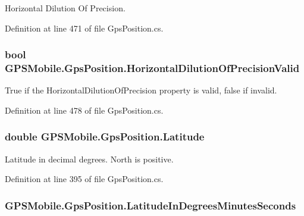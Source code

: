 Horizontal Dilution Of Precision. 

Definition at line 471 of file GpsPosition.cs.\hypertarget{class_g_p_s_mobile_1_1_gps_position_a2cf9490e66f5369dc17f9f7f885e9f3d}{
\subsubsection[{HorizontalDilutionOfPrecisionValid}]{\setlength{\rightskip}{0pt plus 5cm}bool GPSMobile.GpsPosition.HorizontalDilutionOfPrecisionValid}}
\label{class_g_p_s_mobile_1_1_gps_position_a2cf9490e66f5369dc17f9f7f885e9f3d}


True if the HorizontalDilutionOfPrecision property is valid, false if invalid. 

Definition at line 478 of file GpsPosition.cs.\hypertarget{class_g_p_s_mobile_1_1_gps_position_a165e63838ebfe0e712c142f7a757dad6}{
\subsubsection[{Latitude}]{\setlength{\rightskip}{0pt plus 5cm}double GPSMobile.GpsPosition.Latitude}}
\label{class_g_p_s_mobile_1_1_gps_position_a165e63838ebfe0e712c142f7a757dad6}


Latitude in decimal degrees. North is positive. 

Definition at line 395 of file GpsPosition.cs.\hypertarget{class_g_p_s_mobile_1_1_gps_position_abb8229583c518e399546f791d221666d}{
\subsubsection[{LatitudeInDegreesMinutesSeconds}]{ GPSMobile.GpsPosition.LatitudeInDegreesMinutesSeconds}}
\label{class_g_p_s_mobile_1_1_gps_position_abb8229583c518e399546f791d221666d}


